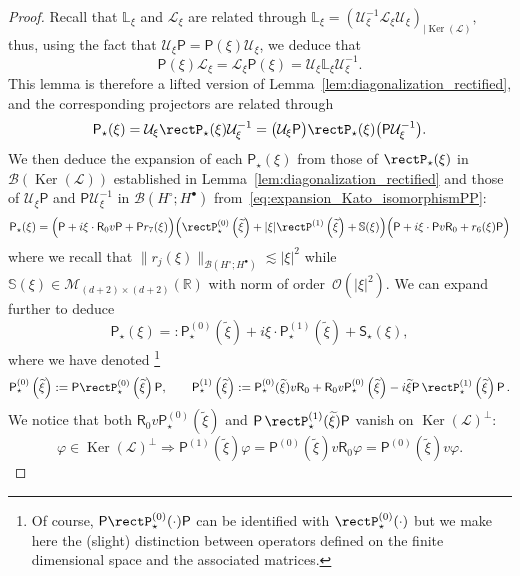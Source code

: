 \documentclass[10pt]{amsart}
\theoremstyle{definition}\newtheorem{defi}[theo]{Definition}\newtheorem{rema}[theo]{Remark}\newtheorem{exam}[theo]{Example}\newtheorem{exem}[theo]{Example}\newtheorem{nota}[theo]{Notation}
\DeclareMathOperator{\nul}{Ker}
\newcommand{\sfR}{\mathsf{R}}
\newcommand{\sfS}{\mathsf{S}}
\newcommand{\R}{\mathbb{R}}
\renewcommand{\S}{\mathbb{S}}
\newcommand{\rectL}{\mathbb{L}}
\newcommand{\OO}{\mathcal{O}}
\newcommand{\LL}{\mathcal{L}}
\newcommand{\PP}{\mathsf{P}}
\newcommand{\UU}{\mathcal{U}}
\newcommand{\BBB}{\mathscr{B}}
\newcommand{\MMM}{\mathscr{M}}
\newcommand{\Ssp}{H^{\bullet}}
\newcommand{\Ssm}{H^{\circ}}
\begin{document}
\begin{proof}
Recall that $\rectL_\xi$ and $\LL_\xi$ are related through $\rectL_\xi = (\UU_\xi^{-1} \LL_{\xi} \UU_\xi)_{| \nul(\LL)},$ thus, using the fact that $\UU_\xi \PP= \PP(\xi) \UU_{\xi}$, we deduce that
\begin{equation*}
\PP(\xi) \LL_{\xi} = \LL_\xi \PP(\xi)= \UU_\xi \rectL_{\xi} \UU_\xi^{-1}.
\end{equation*}
This lemma is therefore a lifted version of Lemma~\ref{lem:diagonalization_rectified}, and the corresponding projectors are related through
\begin{equation*}
\PP_\star(\xi) = \UU_{\xi} \rectP_\star(\xi) \UU_\xi^{-1} = \big(\UU_{\xi} \PP\big) \rectP_\star(\xi) \big(\PP \UU_\xi^{-1}\big).
\end{equation*}
We then deduce the expansion of each $\PP_\star(\xi)$ from those of $\rectP_\star(\xi)$ in $\BBB(\nul(\LL))$ established in Lemma~\ref{lem:diagonalization_rectified} and those of $\UU_\xi \PP$ and $\PP \UU_\xi^{-1}$ in $\BBB(\Ssm ; \Ssp)$ from~\eqref{eq:expansion_Kato_isomorphismPP}:
\[
\PP_\star(\xi) = \Big(\PP + i \xi\cdot \sfR_{0} v \PP + \PP r_{7}(\xi) \Big)
\Big(\rectP_\star^{(0)}\left(\widetilde{\xi} \right) + |\xi| \rectP^{(1)} \left(\widetilde{\xi} \right) + \S(\xi)\Big)\Big(\PP + i \xi \cdot\PP v\sfR_{0} + r_{6}(\xi)\PP \Big)
\]
where we recall that $\|r_{j}(\xi)\|_{\BBB(\Ssm;\Ssp)} \lesssim |\xi|^{2}$ while $\S(\xi) \in \MMM_{(d+2)\times (d+2)}(\R)$ with norm of order~$\OO(|\xi|^2).$ We can expand further to deduce
\[
\PP_\star(\xi) =: \PP_\star^{(0)}\left(\widetilde{\xi}\right) + i \xi \cdot \PP^{(1)}_\star\left(\widetilde{\xi}\right) + \sfS_{\star}(\xi),
\]
where we have denoted \footnote{Of course, $\PP\rectP^{(0)}_{\star}(\cdot)\PP$ can be identified with $\rectP^{(0)}_{\star}(\cdot)$ but we make here the (slight) distinction between operators defined on the finite dimensional space and the associated matrices.}
\begin{gather*}
\PP^{(0)}_\star\left(\widetilde{\xi} \right) := \PP\rectP^{(0)}_\star\left(\widetilde{\xi} \right)\PP,
\qquad
\PP_\star^{(1)}\left(\widetilde{\xi} \right) := \PP^{(0)}_\star(\widetilde{\xi}) v \sfR_{0} +\sfR_{0}v \PP^{(0)}_{\star}\left(\widetilde{\xi}\right)-i\widetilde{\xi}\PP\,\rectP^{(1)}_{\star}\left(\widetilde{\xi}\right)\PP\,.
\end{gather*}
We notice that both $\sfR_{0}v\PP^{(0)}_{\star}(\widetilde{\xi})$ and $\PP\,\rectP^{(1)}_{\star}(\widetilde{\xi})\PP$ vanish on $\nul(\LL)^\perp$:
\[
\varphi \in \nul(\LL)^\perp \Rightarrow \PP^{(1)} \left(\widetilde{\xi} \right) \varphi = \PP^{(0)} \left(\widetilde{\xi} \right) v \sfR_{0} \varphi = \PP^{(0)} \left(\widetilde{\xi} \right) v \varphi.
\]
\end{proof}
\end{document}
